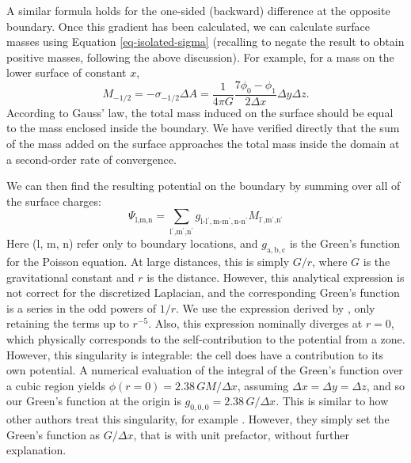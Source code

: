 \documentclass[12pt,preprint]{aastex}
\begin{document}
A similar formula holds for the one-sided (backward) difference at the opposite boundary. Once this gradient has been calculated, we can calculate surface masses using Equation \ref{eq-isolated-sigma} (recalling to negate the result to obtain positive masses, following the above discussion). For example, for a mass on the lower surface of constant $x$,
\begin{equation}
  M_{-1/2} = -\sigma_{-1/2} \Delta A = \frac{1}{4\pi G} \frac{7\phi_{0} - \phi_{1}}{2\Delta x}\Delta y \Delta z.
\end{equation}
According to Gauss' law, the total mass induced on the surface should be equal to the mass enclosed inside the boundary. We have verified directly that the sum of the mass added on the surface approaches the total mass inside the domain at a second-order rate of convergence.

We can then find the resulting potential on the boundary by summing over all of the surface charges:
\begin{equation}
  \Psi_{\text{l,m,n}} = \sum_{\text{l$^\prime$,m$^\prime$,n$^\prime$}} g_{\text{l-l$^\prime$},\text{m-m$^\prime$},\text{n-n$^\prime$}} M_{\text{l$^\prime$,m$^\prime$,n$^\prime$}}
\end{equation}
Here (l, m, n) refer only to boundary locations, and $g_{\text{a},\text{b},\text{c}}$ is the Green's function for the Poisson equation. At large distances, this is simply $G / r$, where $G$ is the gravitational constant and $r$ is the distance. However, this analytical expression is not correct for the discretized Laplacian, and the corresponding Green's function is a series in the odd powers of $1/r$. We use the expression derived by \citet{burkhart:1997}, only retaining the terms up to $r^{-5}$. Also, this expression nominally diverges at $r = 0$, which physically corresponds to the self-contribution to the potential from a zone. However, this singularity is integrable: the cell does have a contribution to its own potential. A numerical evaluation of the integral of the Green's function over a cubic region yields $\phi(r = 0) = 2.38\, G M / \Delta x$, assuming $\Delta x = \Delta y = \Delta z$, and so our Green's function at the origin is $g_{0,0,0} = 2.38\, G / \Delta x$. This is similar to how other authors treat this singularity, for example \citet{hockney_eastwood}. However, they simply set the Green's function as $G / \Delta x$, that is with unit prefactor, without further explanation.
\end{document}
